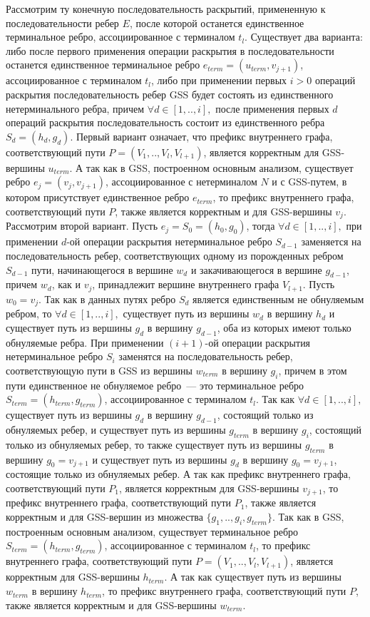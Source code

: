 Рассмотрим ту конечную последовательность раскрытий, примененную к последовательности ребер $E$, после которой останется единственное терминальное ребро, ассоциированное с терминалом $t_{l}$. Существует два варианта: либо после первого применения операции раскрытия в последовательности останется единственное терминальное ребро $e_{term} = (u_{term}, v_{j+1})$, ассоциированное с терминалом $t_{l}$, либо при применении первых $i > 0$ операций раскрытия последовательность ребер GSS будет состоять из единственного нетерминального ребра, причем $\forall d \in [1,..,i],$ после применения первых $d$ операций раскрытия последовательность состоит из единственного ребра $S_{d} = (h_{d}, g_{d})$. Первый вариант означает, что префикс внутреннего графа, соответствующий пути $P = (V_{1},..,V_{l},V_{l+1})$, является корректным для GSS-вершины $u_{term}$. А так как в GSS, построенном основным анализом, существует ребро $e_{j} = (v_{j}, v_{j+1})$, ассоциированное с нетерминалом $N$ и с GSS-путем, в котором присутствует единственное ребро $e_{term}$, то префикс внутреннего графа, соответствующий пути $P$, также является корректным и для GSS-вершины $v_{j}$. Рассмотрим второй вариант. Пусть $e_{j} = S_{0} = (h_{0}, g_{0})$, тогда $\forall d \in [1,..,i],$ при применении $d$-ой операции раскрытия нетерминальное ребро $S_{d-1}$ заменяется на последовательность ребер, соответствующих одному из порожденных ребром $S_{d-1}$ пути, начинающегося в вершине $w_{d}$ и закачивающегося в вершине $g_{d-1}$, причем $w_{d}$, как и $v_{j}$, принадлежит вершине внутреннего графа $V_{l+1}$. Пусть $w_{0} = v_{j}$. Так как в данных путях ребро $S_{d}$ является единственным не обнуляемым ребром, то $\forall d \in [1,..,i],$ существует путь из вершины $w_{d}$ в вершину $h_{d}$ и существует путь из вершины $g_{d}$ в вершину $g_{d-1}$, оба из которых имеют только обнуляемые ребра. При применении $(i+1)$-ой операции раскрытия нетерминальное ребро $S_{i}$ заменятся на последовательность ребер, соответствующую пути в GSS из вершины $w_{term}$ в вершину $g_{i}$, причем в этом пути единственное не обнуляемое ребро~--- это терминальное ребро $S_{term} = (h_{term}, g_{term})$, ассоциированное с терминалом $t_{l}$. Так как $\forall d \in [1,..,i],$ существует путь из вершины $g_{d}$ в вершину $g_{d-1}$, состоящий только из обнуляемых ребер, и существует путь из вершины $g_{term}$ в вершину $g_{i}$, состоящий только из обнуляемых ребер, то также существует путь из вершины $g_{term}$ в вершину $g_{0} = v_{j+1}$ и существует путь из вершины $g_{d}$ в вершину $g_{0} = v_{j+1}$, состоящие только из обнуляемых ребер. А так как префикс внутреннего графа, соответствующий пути $P_{1}$, является корректным для GSS-вершины $v_{j+1}$, то префикс внутреннего графа, соответствующий пути $P_{1}$, также является корректным и для GSS-вершин из множества $\{g_{1},..,g_{i}, g_{term}\}$. Так как в GSS, построенным основным анализом, существует терминальное ребро $S_{term} = (h_{term}, g_{term})$, ассоциированное с терминалом $t_{l}$, то префикс внутреннего графа, соответствующий пути $P = (V_{1},..,V_{l},V_{l+1})$, является корректным для GSS-вершины $h_{term}$.  А так как существует путь из вершины $w_{term}$ в вершину $h_{term}$, то префикс внутреннего графа, соответствующий пути $P$, также является корректным и для GSS-вершины $w_{term}$. 